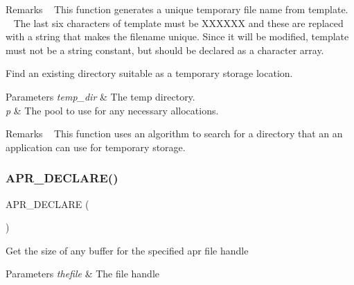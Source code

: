 \begin{DoxyRemark}{Remarks}
~\newline
This function generates a unique temporary file name from template. ~\newline
The last six characters of template must be X\+X\+X\+X\+XX and these are replaced with a string that makes the filename unique. Since it will be modified, template must not be a string constant, but should be declared as a character array.
\end{DoxyRemark}
Find an existing directory suitable as a temporary storage location. 
\begin{DoxyParams}{Parameters}
{\em temp\+\_\+dir} & The temp directory. \\
\hline
{\em p} & The pool to use for any necessary allocations. \\
\hline
\end{DoxyParams}
\begin{DoxyRemark}{Remarks}
~\newline
This function uses an algorithm to search for a directory that an an application can use for temporary storage. 
\end{DoxyRemark}
\mbox{\label{group__apr__file__io_gad950dd5773690685ffed1e4a02ccdefa}} 
\subsubsection{\texorpdfstring{A\+P\+R\+\_\+\+D\+E\+C\+L\+A\+R\+E()}{APR\_DECLARE()}\hspace{0.1cm}{\footnotesize\ttfamily [2/3]}}
{\footnotesize\ttfamily A\+P\+R\+\_\+\+D\+E\+C\+L\+A\+RE (\begin{DoxyParamCaption}\item[{apr\+\_\+size\+\_\+t}]{ }\end{DoxyParamCaption})}

Get the size of any buffer for the specified apr file handle 
\begin{DoxyParams}{Parameters}
{\em thefile} & The file handle \\
\hline
\end{DoxyParams}
\mbox{\label{group__apr__file__io_ga9abb05e265685deb5a7db8ee8eb02237}} 
